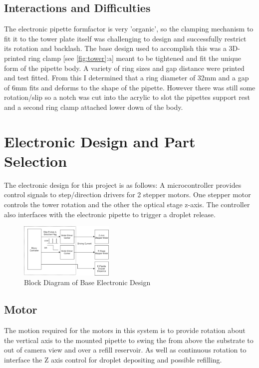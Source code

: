 \subsection{Interactions and Difficulties}
The electronic pipette formfactor is very 'organic', so the clamping mechanism to fit it to the tower plate itself was challenging to design and successfully restrict its rotation and backlash.  
The base design used to accomplish this was a 3D-printed ring clamp [see \ref{fig:tower}:a] meant to be tightened and fit the unique form of the pipette body. A variety of ring sizes and gap distance were printed and test fitted. From this I determined that a ring diameter of 32mm and a gap of 6mm fits and deforms to the shape of the pipette. However there was still some rotation/slip so a notch was cut into the acrylic to slot the pipettes support rest and a second ring clamp attached lower down of the body. 

\section{Electronic Design and Part Selection}

The electronic design for this project is as follows:
A microcontroller provides control signals to step/direction drivers for 2 stepper motors. One stepper motor controls the tower rotation and the other the optical stage z-axis. The controller also interfaces with the electronic pipette to trigger a droplet release.

\begin{figure}[h]
    \centering
    \includegraphics[width=0.4\textwidth]{img/ED_block_diag.png}
    \caption{Block Diagram of Base Electronic Design}
    \label{fig:e_block}
\end{figure}

\subsection{Motor}
The motion required for the motors in this system is to provide rotation about the vertical axis to the mounted pipette to swing the from above the substrate to out of camera view and over a refill reservoir. As well as continuous rotation to interface the Z axis control for droplet depositing and possible refilling.  

